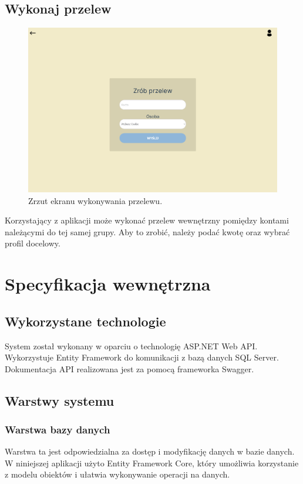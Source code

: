 \documentclass[12pt,a4paper,oneside]{article}
\begin{document}
\subsection{Wykonaj przelew}
\begin{figure}[H]
    \centering
    \includegraphics[width=\hsize,keepaspectratio]{images/make_transfer.png}
    \caption{Zrzut ekranu wykonywania przelewu.}
\end{figure}
Korzystający z aplikacji może wykonać przelew wewnętrzny pomiędzy kontami
należącymi do tej samej grupy. Aby to zrobić, należy podać kwotę oraz wybrać
profil docelowy.

\section{Specyfikacja wewnętrzna}
\subsection{Wykorzystane technologie}
System został wykonany w oparciu o technologię ASP.NET Web API. Wykorzystuje
Entity Framework do komunikacji z bazą danych SQL Server. Dokumentacja API
realizowana jest za pomocą frameworka Swagger.


\subsection{Warstwy systemu}
\subsubsection{Warstwa bazy danych}
Warstwa ta jest odpowiedzialna za dostęp i modyfikację danych w bazie danych.
W niniejszej aplikacji użyto Entity Framework Core, który umożliwia korzystanie
z modelu obiektów i ułatwia wykonywanie operacji na danych.
\end{document}
